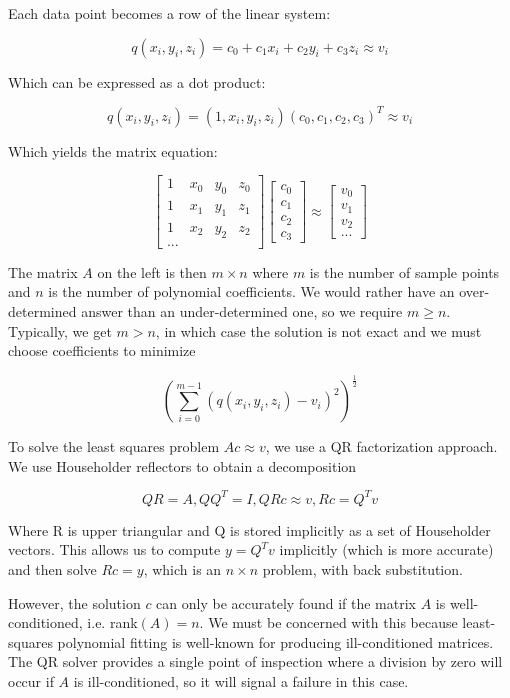 \documentclass{article}
\begin{document}
Each data point becomes a row of the linear system:

\[q(x_i,y_i,z_i) = c_0 + c_1 x_i + c_2 y_i + c_3 z_i \approx v_i \]

Which can be expressed as a dot product:

\[q(x_i,y_i,z_i) = (1,x_i,y_i,z_i)(c_0,c_1,c_2,c_3)^T \approx v_i \]

Which yields the matrix equation:

\[\begin{bmatrix}
1 & x_0 & y_0 & z_0 \\
1 & x_1 & y_1 & z_1 \\
1 & x_2 & y_2 & z_2 \\
\text{...}
\end{bmatrix}
\begin{bmatrix} c_0 \\ c_1 \\ c_2 \\ c_3 \end{bmatrix}
\approx
\begin{bmatrix} v_0 \\ v_1 \\ v_2 \\ ... \end{bmatrix}
\]

The matrix $A$ on the left is then $m\times n$ where $m$
is the number of sample points and $n$ is the number of
polynomial coefficients.
We would rather have an over-determined answer than
an under-determined one, so we require $m \geq n$.
Typically, we get $m > n$, in which case the solution
is not exact and we must choose coefficients to minimize

\[ \left( \sum_{i=0}^{m-1} (q(x_i,y_i,z_i) - v_i)^2 \right)^\frac12 \]

To solve the least squares problem $Ac \approx v$, we
use a QR factorization approach.
We use Householder reflectors to obtain a decomposition

\[QR = A, QQ^T = I, QRc \approx v, Rc = Q^Tv\]

Where R is upper triangular and Q is stored implicitly
as a set of Householder vectors.
This allows us to compute $y = Q^Tv$ implicitly
(which is more accurate)
and then solve $Rc = y$, which is an $n\times n$ problem,
with back substitution.

However, the solution $c$ can only be accurately found
if the matrix $A$ is well-conditioned, i.e. rank$(A) = n$.
We must be concerned with this because least-squares polynomial
fitting is well-known for producing ill-conditioned matrices.
The QR solver provides a single point of inspection where
a division by zero will occur if $A$ is ill-conditioned,
so it will signal a failure in this case.
\end{document}
